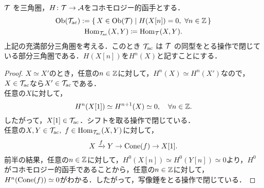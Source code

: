 \begin{prop}\label{prop:cohomological functor and triangulated category}
	${\mathcal T}$ を三角圏，$H\colon {\mathcal T}\to{\mathcal A}$をコホモロジー的函手とする．
	\begin{gather*}
		\mathrm{Ob}({\mathcal T}_{\mathrm{ac}})
		:=\{\,X\in \mathrm{Ob}({\mathcal T}) \mid H(X[n])=0,\ \forall n\in\mathbb{Z}\,\}\\
		\operatorname{\mathrm{Hom}}_{{\mathcal T}_{\mathrm{ac}}}(X,Y) \coloneq\operatorname{\mathrm{Hom}}_{{\mathcal T}}(X,Y) .
\end{gather*}
上記の充満部分三角圏を考える．このとき ${\mathcal T}_{\mathrm{ac}}$ は ${\mathcal T}$ の同型をとる操作で閉じている部分三角圏である．$H(X[n])$を$H^n(X)$と記すことにする．
\end{prop}
\begin{proof}
	$X \simeq X'$のとき，任意の$n\in{\mathbb Z}$に対して，$H^n(X)\simeq H^n(X')$なので，$X\in{\mathcal T}_{\mathrm{ac}}$なら$X'\in {\mathcal T}_{\mathrm{ac}}$である．\\
	任意の$X$に対して，
	\[H^n(X[1])\simeq H^{n+1}(X)\simeq 0,\quad \forall n\in{\mathbb Z}.\]
	したがって，$X[1]\in{\mathcal T}_{\mathrm{ac}}$．シフトを取る操作で閉じている．\\
	任意の$X, Y\in\T_{\mathrm{ac}},\ f\in\Hom_{\T_{\mathrm{ac}}}(X,Y)$に対して，
	\[X \xrightarrow{f} Y\rightarrow \operatorname{\mathrm{Cone}}(f) \rightarrow X[1] .\]
	前半の結果，任意の$n\in{\mathbb Z}$に対して，$H^0(X[n])\simeq H^0(Y[n])\simeq 0$より，$H^0$がコホモロジー的函手であることから，任意の$n\in{\mathbb Z}$に対して，$H^n(\operatorname{\mathrm{Cone}}(f))\simeq 0$がわかる．したがって，写像錘をとる操作で閉じている．
\end{proof}

